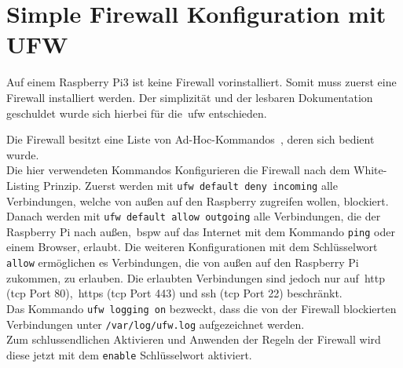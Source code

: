 
\section{Simple Firewall Konfiguration mit UFW}\label{sec:simple-firewall-konfiguration}
Auf einem Raspberry Pi3 ist keine Firewall vorinstalliert.
Somit muss zuerst eine Firewall installiert werden.
Der simplizität und der lesbaren Dokumentation geschuldet wurde sich hierbei für die~\gls{ufw} entschieden.

Die Firewall besitzt eine Liste von Ad-Hoc-Kommandos~\cite{ufw-doc}, deren sich bedient wurde.
\\
Die hier verwendeten Kommandos Konfigurieren die Firewall nach dem White-Listing Prinzip.
Zuerst werden mit \texttt{ufw default deny incoming} alle Verbindungen, welche von außen auf den Raspberry zugreifen wollen, blockiert.
Danach werden mit \texttt{ufw default allow outgoing} alle Verbindungen, die der Raspberry Pi nach außen,~\gls{bspw} auf
das Internet mit dem Kommando \texttt{ping} oder einem Browser, erlaubt.
Die weiteren Konfigurationen mit dem Schlüsselwort \texttt{allow} ermöglichen es Verbindungen, die von außen auf den Raspberry Pi zukommen,
zu erlauben.
Die erlaubten Verbindungen sind jedoch nur auf~\gls{http} (\gls{tcp} Port 80),~\gls{https} (\gls{tcp} Port 443) und \gls{ssh} (\gls{tcp} Port 22) beschränkt. \\
Das Kommando \texttt{ufw logging on} bezweckt, dass die von der Firewall blockierten Verbindungen unter \texttt{/var/log/ufw.log} aufgezeichnet werden. \\
Zum schlussendlichen Aktivieren und Anwenden der Regeln der Firewall wird diese jetzt mit dem \texttt{enable} Schlüsselwort aktiviert.
